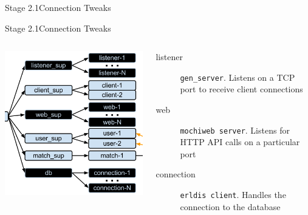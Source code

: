 \documentclass[utf8]{beamer}
\begin{document}
\begin{frame}{Stage 2.1}{Connection Tweaks}
\listener
\end{frame}
\begin{frame}{Stage 2.1}{Connection Tweaks}
	\begin{columns}
			\begin{center}
				\includegraphics[height=.7\textheight]{img/architecture-2.png}
			\end{center}
			\begin{description}
				\item[listener]
					\texttt{gen\_server}. Listens on a TCP port to receive client connections
				\item[web]
					\texttt{mochiweb server}. Listens for HTTP API calls on a particular port
				\item[connection]
					\texttt{erldis client}. Handles the connection to the database
			\end{description}
	\end{columns}
\end{frame}
\end{document}
